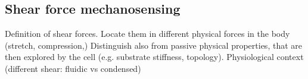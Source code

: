 \subsection{Shear force mechanosensing}
Definition of shear forces. Locate them in different physical forces in the body (stretch, compression,) Distinguish also from passive physical properties, that are then explored by the cell (e.g. substrate stiffness, topology).
Physiological context (different shear: fluidic vs condensed)
